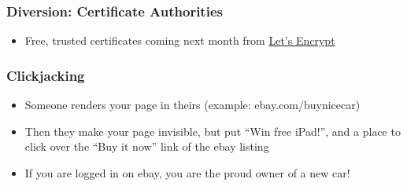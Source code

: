 \documentclass[9pt]{beamer}
\begin{document}
%
%
\begin{frame}[fragile]
\frametitle{Diversion: Certificate Authorities}
\begin{itemize}
\item Free, trusted certificates coming next month from \href{https://letsencrypt.org/}{Let's Encrypt}
\end{itemize}
\end{frame}

\begin{frame}[fragile]
\frametitle{Clickjacking}
\begin{itemize}
\item Someone renders your page in theirs (example: ebay.com/buynicecar)
\pause
\item Then they make your page invisible, but put ``Win free iPad!'', and a place to click over the ``Buy it now'' link of the ebay listing
\pause
\item If you are logged in on ebay, you are the proud owner of a new car!
\end{itemize}
\end{frame}
\end{document}

